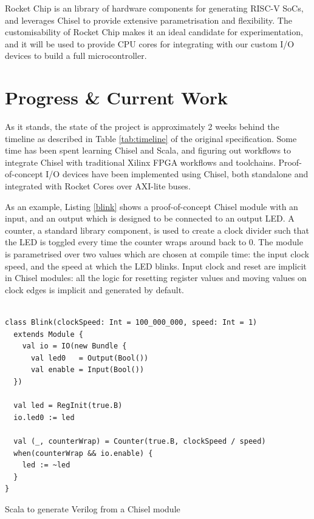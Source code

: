 \documentclass[a4paper,fleqn,12pt]{article}
\begin{document}
Rocket Chip is an library of hardware components for generating RISC-V SoCs, and leverages Chisel to provide extensive parametrisation and flexibility. The customisability of Rocket Chip makes it an ideal candidate for experimentation, and it will be used to provide CPU cores for integrating with our custom I/O devices to build a full microcontroller.

\section{Progress \& Current Work}

As it stands, the state of the project is approximately 2 weeks behind the timeline as described in Table \ref{tab:timeline} of the original specification. Some time has been spent learning Chisel and Scala, and figuring out workflows to integrate Chisel with traditional Xilinx FPGA workflows and toolchains. Proof-of-concept I/O devices have been implemented using Chisel, both standalone and integrated with Rocket Cores over AXI-lite buses.

As an example, Listing \ref{blink} shows a proof-of-concept Chisel module with an  input, and an output  which is designed to be connected to an output LED. A counter, a standard library component, is used to create a clock divider such that the LED is toggled every time the counter wraps around back to 0. The module is parametrised over two values which are chosen at compile time: the input clock speed, and the speed at which the LED blinks. Input clock and reset are implicit in Chisel modules: all the logic for resetting register values and moving values on clock edges is implicit and generated by default.


\begin{listing}[ht!]
	\vspace{0.5cm}
	\begin{verbatim}

class Blink(clockSpeed: Int = 100_000_000, speed: Int = 1) 
  extends Module {
    val io = IO(new Bundle {
      val led0   = Output(Bool())
      val enable = Input(Bool())
  })
  
  val led = RegInit(true.B)
  io.led0 := led
  
  val (_, counterWrap) = Counter(true.B, clockSpeed / speed)
  when(counterWrap && io.enable) {
    led := ~led
  }
}
    \end{verbatim}
	\caption{Scala to generate Verilog from a Chisel module}
	\label{blink}
\end{listing}
\end{document}
